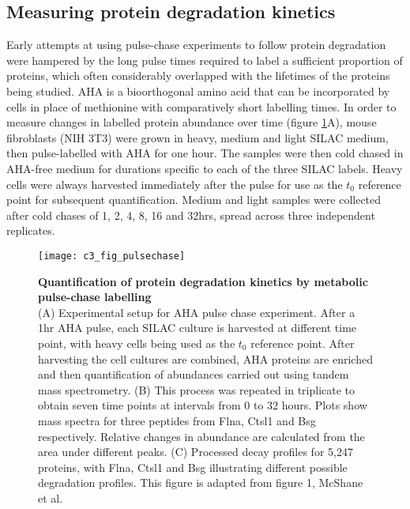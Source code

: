 \documentclass[a4paper,11pt,twoside,openright]{scrbook}
\begin{document}
\subsection{Measuring protein degradation kinetics}
Early attempts at using pulse-chase experiments to follow protein degradation were hampered by the long pulse times required to label a sufficient proportion of proteins, which often considerably overlapped with the lifetimes of the proteins being studied. AHA is a bioorthogonal amino acid that can be incorporated by cells in place of methionine with comparatively short labelling times. In order to measure changes in labelled protein abundance over time (figure \ref{figure:pulsechase}A), mouse fibroblasts (NIH 3T3) were grown in heavy, medium and light SILAC medium, then pulse-labelled with AHA for one hour. The samples were then cold chased in AHA-free medium for durations specific to each of the three SILAC labels. Heavy cells were always harvested immediately after the pulse for use as the $t_{0}$ reference point for subsequent quantification. Medium and light samples were collected after cold chases of 1, 2, 4, 8, 16 and 32hrs, spread across three independent replicates.

\begin{figure}
    \texttt{[image: c3\_fig\_pulsechase]}
    \caption[Quantification of protein degradation kinetics by metabolic pulse-chase labelling]{\sffamily \textbf{Quantification of protein degradation kinetics by metabolic pulse-chase labelling} \\ \small (A) Experimental setup for AHA pulse chase experiment. After a 1hr AHA pulse, each SILAC culture is harvested at different time point, with heavy cells being used as the $t_{0}$ reference point. After harvesting the cell cultures are combined, AHA proteins are enriched and then quantification of abundances carried out using tandem mass spectrometry. (B) This process was repeated in triplicate to obtain seven time points at intervals from 0 to 32 hours. Plots show mass spectra for three peptides from Flna, Ctsl1 and Bsg respectively. Relative changes in abundance are calculated from the area under different peaks. (C) Processed decay profiles for 5,247 proteins, with Flna, Ctsl1 and Bsg illustrating different possible degradation profiles. This figure is adapted from figure 1, McShane et al.\cite{McShane2016}}
    \label{figure:pulsechase}
\end{figure}
\end{document}
